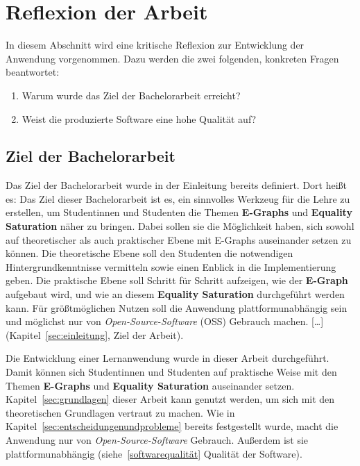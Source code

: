 \section{Reflexion der Arbeit}\label{sec:reflexion}

In diesem Abschnitt wird eine kritische Reflexion zur Entwicklung der Anwendung vorgenommen. Dazu werden die zwei folgenden, konkreten Fragen beantwortet:

\begin{enumerate}[nolistsep]
    \item Warum wurde das Ziel der Bachelorarbeit erreicht?
    \item Weist die produzierte Software eine hohe Qualität auf?
\end{enumerate}

\subsection{Ziel der Bachelorarbeit}

Das Ziel der Bachelorarbeit wurde in der Einleitung bereits definiert. Dort heißt es: 
\glqq Das Ziel dieser Bachelorarbeit ist es, ein sinnvolles Werkzeug für die Lehre zu erstellen,
um Studentinnen und Studenten die Themen \textbf{E-Graphs} und \textbf{Equality Saturation} näher zu bringen.
Dabei sollen sie die Möglichkeit haben, sich sowohl auf theoretischer als auch praktischer Ebene mit E-Graphs auseinander setzen zu können.
Die theoretische Ebene soll den Studenten die notwendigen Hintergrundkenntnisse vermitteln sowie einen Enblick in die Implementierung geben.
Die praktische Ebene soll Schritt für Schritt aufzeigen, wie der \textbf{E-Graph} aufgebaut wird, und wie an diesem \textbf{Equality Saturation} durchgeführt werden kann.
Für grö{\ss}tmöglichen Nutzen soll die Anwendung plattformunabhängig sein und möglichst nur von \textit{Open-Source-Software} (OSS) Gebrauch machen. [\ldots]\grqq 
(Kapitel~\ref{sec:einleitung}, Ziel der Arbeit).

Die Entwicklung einer Lernanwendung wurde in dieser Arbeit durchgeführt. Damit können sich Studentinnen und Studenten auf praktische Weise mit den Themen 
\textbf{E-Graphs} und \textbf{Equality Saturation} auseinander setzen. Kapitel~\ref{sec:grundlagen} dieser Arbeit kann genutzt werden, um sich mit den
theoretischen Grundlagen vertraut zu machen. 
Wie in Kapitel~\ref{sec:entscheidungenundprobleme} bereits festgestellt wurde, macht die Anwendung nur von \textit{Open-Source-Software} Gebrauch. Außerdem ist
sie plattformunabhängig (siehe~\ref{softwarequalität} Qualität der Software).




